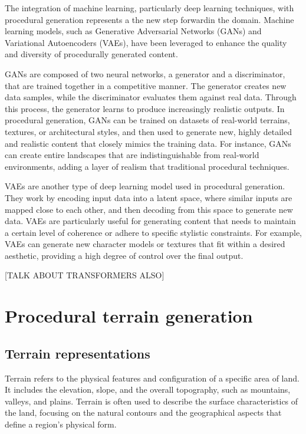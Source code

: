 The integration of machine learning, particularly deep learning techniques, with procedural generation represents a the new step forwardin the domain. Machine learning models, such as Generative Adversarial Networks (GANs) and Variational Autoencoders (VAEs), have been leveraged to enhance the quality and diversity of procedurally generated content.

GANs are composed of two neural networks, a generator and a discriminator, that are trained together in a competitive manner. The generator creates new data samples, while the discriminator evaluates them against real data. Through this process, the generator learns to produce increasingly realistic outputs. In procedural generation, GANs can be trained on datasets of real-world terrains, textures, or architectural styles, and then used to generate new, highly detailed and realistic content that closely mimics the training data. For instance, GANs can create entire landscapes that are indistinguishable from real-world environments, adding a layer of realism that traditional procedural techniques.

VAEs are another type of deep learning model used in procedural generation. They work by encoding input data into a latent space, where similar inputs are mapped close to each other, and then decoding from this space to generate new data. VAEs are particularly useful for generating content that needs to maintain a certain level of coherence or adhere to specific stylistic constraints. For example, VAEs can generate new character models or textures that fit within a desired aesthetic, providing a high degree of control over the final output.

[TALK ABOUT TRANSFORMERS ALSO]





\section{Procedural terrain generation}

\subsection{Terrain representations}

Terrain refers to the physical features and configuration of a specific area of land. It includes the elevation, slope, and the overall topography, such as mountains, valleys, and plains. Terrain is often used to describe the surface characteristics of the land, focusing on the natural contours and the geographical aspects that define a region's physical form.

